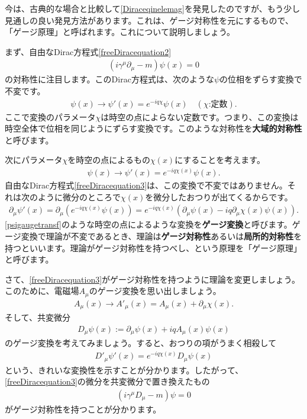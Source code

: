 \documentclass[report,paper=a4, fontsize=12pt, line_length=16cm, number_of_lines=33,dvipdfmx]{jlreq}
\numberwithin{equation}{chapter}
\newcommand{\del}{\partial}
\newcommand{\strong}[1]{{\sffamily \bfseries #1}}
\begin{document}
今は、古典的な場合と比較して\eqref{Diraceqinelemag}を発見したのですが、もう少し見通しの良い発見方法があります。これは、ゲージ対称性を元にするもので、「ゲージ原理」と呼ばれます。これについて説明しましょう。

まず、自由なDirac方程式\eqref{freeDiracequation2}
\begin{align}
  (i\gamma^{\mu}\del_{\mu}-m)\psi(x)=0\label{freeDiracequation3}
\end{align}
の対称性に注目します。このDirac方程式は、次のような$\psi$の位相をずらす変換で不変です。
\begin{align}
  \psi(x)\to \psi'(x)=e^{-iq\chi}\psi(x)\quad (\chi \text{:定数}).
\end{align}
ここで変換のパラメータ$\chi$は時空の点によらない定数です。つまり、この変換は時空全体で位相を同じようにずらす変換です。このような対称性を\strong{大域的対称性}と呼びます。

次にパラメータ$\chi$を時空の点によるもの$\chi(x)$にすることを考えます。
\begin{align}
  \psi(x)\to \psi'(x)=e^{-iq\chi(x)}\psi(x).\label{psigaugetransf}
\end{align}
自由なDirac方程式\eqref{freeDiracequation3}は、この変換で不変ではありません。それは次のように微分のところで$\chi(x)$を微分したおつりが出てくるからです。
\begin{align}
  \del_{\mu}\psi'(x)=\del_{\mu}(e^{-iq\chi(x)}\psi(x))
  =e^{-iq\chi(x)}(\del_{\mu}\psi(x)-iq\del_{\mu}\chi(x)\psi(x)).
\end{align}
\eqref{psigaugetransf}のような時空の点によるような変換を\strong{ゲージ変換}と呼びます。ゲージ変換で理論が不変であるとき、理論は\strong{ゲージ対称性}あるいは\strong{局所的対称性}を持つといいます。理論がゲージ対称性を持つべし、という原理を「ゲージ原理」と呼びます。

さて、\eqref{freeDiracequation3}がゲージ対称性を持つように理論を変更しましょう。このために、電磁場$A_{\mu}$のゲージ変換を思い出しましょう。
\begin{align}
  A_{\mu}(x)\to A'_{\mu}(x)=A_{\mu}(x)+\del_{\mu}\chi(x).\label{Agaugetransf}
\end{align}
そして、共変微分
\begin{align}
  D_{\mu}\psi(x):=\del_{\mu}\psi(x)+iqA_{\mu}(x)\psi(x)
\end{align}
のゲージ変換を考えてみましょう。すると、おつりの項がうまく相殺して
\begin{align}
  D'_{\mu}\psi'(x)=e^{-iq\chi(x)}D_{\mu}\psi(x)
\end{align}
という、きれいな変換性を示すことが分かります。したがって、\eqref{freeDiracequation3}の微分を共変微分で置き換えたもの
\begin{align}
  (i\gamma^{\mu}D_{\mu}-m)\psi=0
\end{align}
がゲージ対称性を持つことが分かります。
\end{document}
